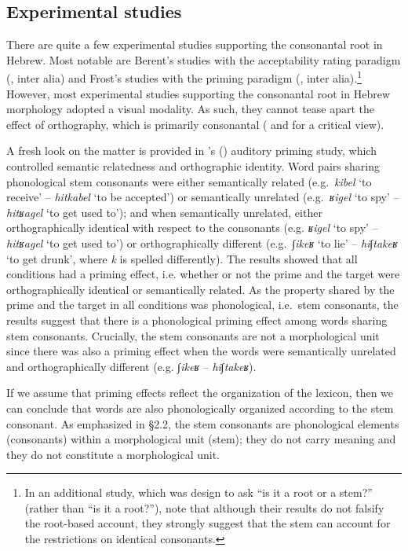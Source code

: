 \documentclass[output=paper,
modfonts
]{LSP/langsci}
\begin{document}
\subsection{Experimental studies}
There are quite a few experimental studies supporting the consonantal root in Hebrew. Most
notable are Berent's studies with the acceptability rating paradigm
(\citealt{berent1997a, berent2001a}, inter alia) and Frost's
studies with the priming paradigm (\citealt{Frost1997, frost2000a}, inter
alia).\footnote{In an additional study, which was design to ask ``is it
  a root or a stem?'' (rather than ``is it a root?''), \citet{berent2007aB} note that although their results do not falsify the root-based
  account, they strongly suggest that the stem can account for the
  restrictions on identical consonants.} However, most experimental
studies supporting the consonantal root in Hebrew morphology adopted a
visual modality. As such, they cannot tease apart the effect of
orthography, which is primarily consonantal (\citealt{batel2002a} and \citealt{berrebi2016a} for a critical view).

A fresh look on the matter is provided in \citeauthor{berrebi2016a}'s (\citeyear{berrebi2016a}) auditory
priming study, which controlled semantic relatedness and orthographic
identity. Word pairs sharing phonological stem consonants were either
semantically related (e.g.\ \emph{kibel} `to receive' -- \emph{hitkabel}
`to be accepted') or semantically unrelated (e.g.\ \emph{ʁigel} `to spy'
-- \emph{hitʁagel} `to get used to'); and when semantically unrelated,
either orthographically identical with respect to the consonants (e.g.
\emph{ʁigel} `to spy' -- \emph{hitʁagel} `to get used to') or
orthographically different (e.g.\ \emph{∫ikeʁ} `to lie' --
\emph{hi∫takeʁ} `to get drunk', where \emph{k} is spelled differently).
The results showed that all conditions had a priming effect, i.e.
whether or not the prime and the target were orthographically identical
or semantically related. As the property shared by the prime and the
target in all conditions was phonological, i.e.\ stem consonants, the
results suggest that there is a phonological priming effect among words
sharing stem consonants. Crucially, the stem consonants are not a
morphological unit since there was also a priming effect when the words
were semantically unrelated and orthographically different (e.g.
\emph{∫ikeʁ} -- \emph{hi∫takeʁ}).

If we assume that priming effects reflect the organization of the
lexicon, then we can conclude that words are also phonologically
organized according to the stem consonant. As emphasized in §2.2, the
stem consonants are phonological elements (consonants) within a
morphological unit (stem); they do not carry meaning and they do not
constitute a morphological unit.
\end{document}
